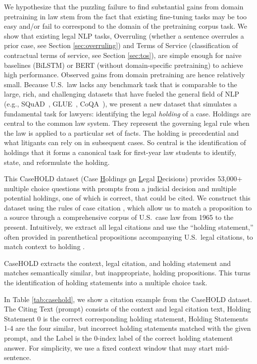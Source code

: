 \documentclass[sigconf]{acmart}
\begin{document}
We hypothesize that the puzzling failure to find substantial gains from domain pretraining in law stem from the fact that existing fine-tuning tasks may be too easy and/or fail to correspond to the domain of the pretraining corpus task. We show that  existing legal NLP tasks, Overruling (whether a sentence overrules a prior case, see Section \ref{sec:overruling}) and Terms of Service (classification of contractual terms of service, see Section \ref{sec:tos}), are simple enough for naive baselines (BiLSTM) or BERT (without domain-specific pretraining) to achieve high performance.  Observed gains from domain pretraining are hence relatively small. Because U.S.\ law lacks any benchmark task that is comparable to the large, rich, and challenging datasets that have fueled the general field of NLP (e.g., SQuAD~\cite{Rajpurkar2016}, GLUE~\cite{Wang2018}, CoQA~\cite{reddy2019coqa}), we present a new dataset that simulates a fundamental task for lawyers: identifying the legal \emph{holding} of a case. Holdings are central to the common law system. They represent the governing legal rule when the law is applied to a particular set of facts. The holding is precedential and what litigants can rely on in subsequent cases. So central is the identification of holdings that it forms a canonical task for first-year law students to identify, state, and reformulate the holding. 

This CaseHOLD dataset (Case \underline{H}oldings \underline{o}n \underline{L}egal \underline{D}ecisions) provides 53,000+ multiple choice questions with prompts from a judicial decision and multiple potential holdings, one of which is correct, that could be cited.  We construct this dataset using the rules of case citation \cite{bluebook}, which allow us to match a proposition to a source through a comprehensive corpus of U.S.\ case law from 1965 to the present. Intuitively, we extract all legal citations and use the ``holding statement,'' often provided in parenthetical propositions accompanying U.S.\ legal citations, to match context to holding \cite{arredondo2017harvesting}.

CaseHOLD extracts the context, legal citation, and holding statement and matches semantically similar, but inappropriate, holding propositions. This turns the identification of holding statements into a multiple choice task.

In Table \ref{tab:casehold}, we show a citation example from the CaseHOLD dataset. The Citing Text (prompt) consists of the context and legal citation text, Holding Statement 0 is the correct corresponding holding statement, Holding Statements 1-4 are the four similar, but incorrect holding statements matched with the given prompt, and the Label is the 0-index label of the correct holding statement answer. For simplicity, we use a fixed context window that may start mid-sentence.
\end{document}
